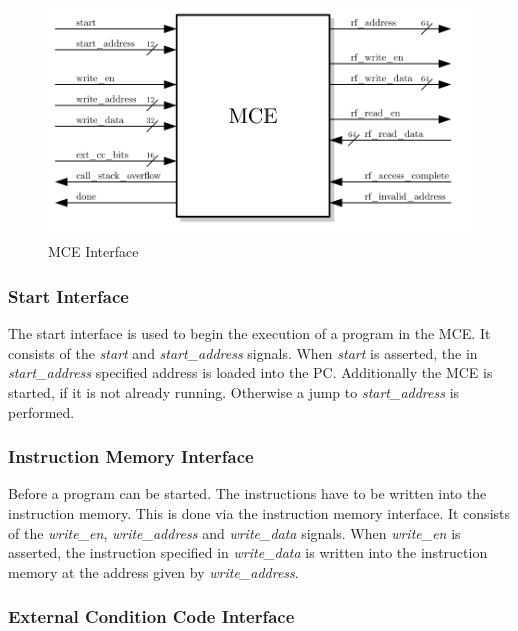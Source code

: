 \begin{figure}[htb]
 \centering
 \includegraphics[scale=1.0]{images/mce_black_box}
 \caption{MCE Interface}
\label{fig:mce_inf}
\end{figure}

\subsubsection{Start Interface}

The start interface is used to begin the execution of a program in the MCE.
It consists of the \emph{start} and \emph{start\_address} signals.
When \emph{start} is asserted, the in  \emph{start\_address} specified address is loaded into the PC.
Additionally the MCE is started, if it is not already running.
Otherwise a jump to \emph{start\_address} is performed.

\subsubsection{Instruction Memory Interface}

Before a program can be started. The instructions have to be written into the instruction memory.
This is done via the instruction memory interface.
It consists of the \emph{write\_en}, \emph{write\_address} and \emph{write\_data} signals.
When \emph{write\_en} is asserted, the instruction specified in \emph{write\_data} is written into the instruction memory at the address given by \emph{write\_address}.

\subsubsection{External Condition Code Interface}

